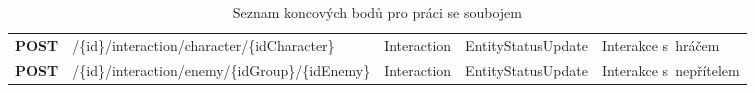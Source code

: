 \begin{table}[h]
{\begin{tabular}{>{\bfseries}r >{\ttfamily}l >{\ttfamily}l >{\ttfamily}H l}
        POST & 
            /\{id\}/interaction/character/\{idCharacter\} & 
            Interaction & EntityStatusUpdate & Interakce s~hráčem \\
        POST & 
            /\{id\}/interaction/enemy/\{idGroup\}/\{idEnemy\} & 
            Interaction & EntityStatusUpdate & Interakce s~nepřítelem \\
        
        \bottomrule
    \end{tabular}}
    \caption{Seznam koncových bodů pro práci se soubojem}
    \label{tab:endpoints}
\end{table}